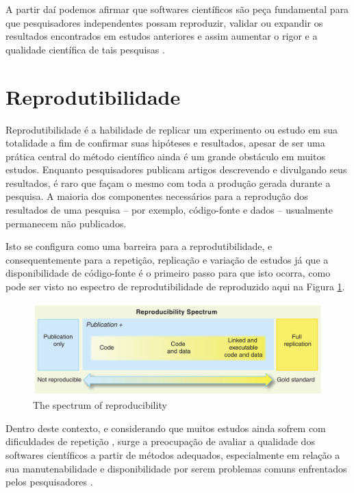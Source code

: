 \documentclass[qual, classic, a4paper]{ufbathesis}
\begin{document}
A partir daí podemos afirmar que softwares científicos são peça fundamental
para que pesquisadores independentes possam reproduzir, validar ou expandir os
resultados encontrados em estudos anteriores e assim aumentar o rigor e a
qualidade científica de tais pesquisas \cite{Vitek2011}.

\section{Reprodutibilidade}

Reprodutibilidade é a habilidade de replicar um experimento ou estudo em sua
totalidade a fim de confirmar suas hipóteses e resultados, apesar de ser uma
prática central do método científico ainda é um grande obstáculo em muitos
estudos. Enquanto pesquisadores publicam artigos descrevendo e divulgando seus
resultados, é raro que façam o mesmo com toda a produção gerada durante a
pesquisa. A maioria dos componentes necessários para a reprodução dos
resultados de uma pesquisa -- por exemplo, código-fonte e dados -- usualmente
permanecem não publicados.

Isto se configura como uma barreira para a reprodutibilidade, e
consequentemente para a repetição, replicação e variação \cite{Feitelson2015}
de estudos já que a disponibilidade de código-fonte é o primeiro passo para
que isto ocorra, como pode ser visto no espectro de reprodutibilidade de
 reproduzido aqui na Figura
\ref{reproducibility-spectrum}.

\begin{figure}[h]
  \center
  \includegraphics[scale=0.25]{imagens/reproducibility-spectrum.png}
  \caption{The spectrum of reproducibility\cite{Peng2011}}
  \label{reproducibility-spectrum}
\end{figure}

Dentro deste contexto, e considerando que muitos estudos ainda sofrem com
dificuldades de repetição \cite{Tang2016}, surge a preocupação de avaliar a
qualidade dos softwares científicos a partir de métodos adequados,
especialmente em relação a sua manutenabilidade e disponibilidade por serem
problemas comuns enfrentados pelos pesquisadores \cite{Prlic2012}.
\end{document}
